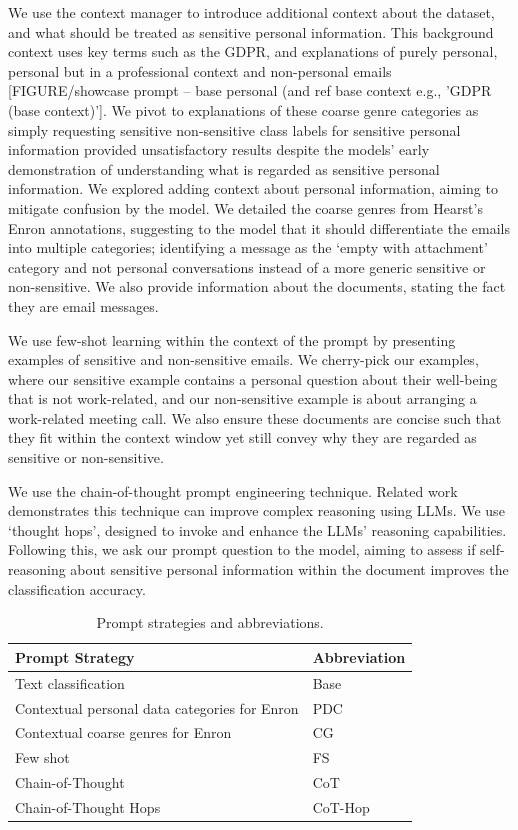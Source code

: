 We use the context manager to introduce additional context about the dataset, and what should be treated as sensitive personal information. This background context uses key terms such as the GDPR, and explanations of purely personal, personal but in a professional context and non-personal emails [FIGURE/showcase prompt – base personal (and ref base context e.g., 'GDPR (base context)']. We pivot to explanations of these coarse genre categories as simply requesting sensitive non-sensitive class labels for sensitive personal information provided unsatisfactory results despite the models' early demonstration of understanding what is regarded as sensitive personal information. We explored adding context about personal information, aiming to mitigate confusion by the model. We detailed the coarse genres from Hearst’s Enron annotations, suggesting to the model that it should differentiate the emails into multiple categories; identifying a message as the ‘empty with attachment’ category and not personal conversations instead of a more generic sensitive or non-sensitive. We also provide information about the documents, stating the fact they are email messages.

We use few-shot learning within the context of the prompt by presenting examples of sensitive and non-sensitive emails. We cherry-pick our examples, where our sensitive example contains a personal question about their well-being that is not work-related, and our non-sensitive example is about arranging a work-related meeting call. We also ensure these documents are concise such that they fit within the context window yet still convey why they are regarded as sensitive or non-sensitive.

We use the chain-of-thought prompt engineering technique. Related work demonstrates this technique can improve complex reasoning using LLMs. We use ‘thought hops’, designed to invoke and enhance the LLMs’ reasoning capabilities. Following this, we ask our prompt question to the model, aiming to assess if self-reasoning about sensitive personal information within the document improves the classification accuracy.

\begin{table}[!h]
\caption{Prompt strategies and abbreviations.}
\label{table:prompt_abbrev}
\begin{tabular}{@{}ll@{}}
\toprule
Prompt Strategy                                   & Abbreviation \\ \midrule
Text classification                               & Base         \\
Contextual personal data categories for Enron & PDC          \\
Contextual coarse genres for Enron            & CG           \\
Few shot                                          & FS           \\
Chain-of-Thought                                  & CoT          \\
Chain-of-Thought Hops                             & CoT-Hop      \\ \bottomrule
\end{tabular}
\end{table}

